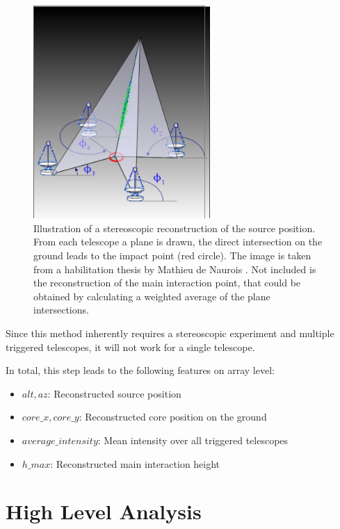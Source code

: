 \begin{figure}
	\centering
	\includegraphics[width=0.6\textwidth]{images/hillas_reco.png}
	\caption{Illustration of a stereoscopic reconstruction of the source position.
    From each telescope a plane is drawn, the direct intersection 
    on the ground leads to the impact point (red circle).
    The image is taken from a habilitation thesis by 
    Mathieu de Naurois \cite{hillas_reco}.
    Not included is the reconstruction of the main interaction point,
    that could be obtained by calculating a weighted average of the plane
    intersections.}
	\label{fig:hillas_reconstructor}
\end{figure}

Since this method inherently requires a stereoscopic experiment
and multiple triggered telescopes, it will not work for a single telescope.

In total, this step leads to the following features on array level:
\begin{itemize}
    \item{$alt, az$: Reconstructed source position}
    \item{$core\_x, core\_y$: Reconstructed core position on the ground}
    \item{$average\_intensity$: Mean intensity over all triggered telescopes}
    \item{$h\_max$: Reconstructed main interaction height}
\end{itemize}

\section{High Level Analysis}

